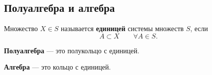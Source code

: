 \subsection{Полуалгебра и алгебра}

\begin{definition}
    Множество $X \in S$ называется \textbf{единицей}
    системы множеств $S$, если
    \[
        A \subset X \qquad \forall A \in S.
    \]
\end{definition}

\begin{definition}[Полуалгебра]
    \textbf{Полуалгебра} --- это полукольцо с единицей.
\end{definition}

\begin{definition}[Алгебра]
    \textbf{Алгебра} --- это кольцо с единицей.
\end{definition}



